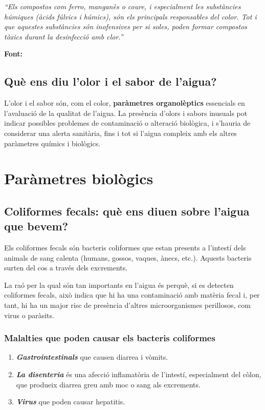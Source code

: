 \textit{“Els compostos com ferro, manganès o coure, i especialment les substàncies húmiques (àcids fúlvics i húmics), són els principals responsables del color. Tot i que aquestes substàncies són inofensives per si soles, poden formar compostos tòxics durant la desinfecció amb clor.”}~\cite{HA}

\textbf{Font:} \cite{HA}

\subsection{Què ens diu l’olor i el sabor de l’aigua?} \label{subsec:olorisabor}
L’olor i el sabor són, com el color, \textbf{paràmetres organolèptics} essencials en l’avaluació de la qualitat de l’aigua. La presència d’olors i sabors inusuals pot indicar possibles problemes de contaminació o alteració biològica, i s’hauria de considerar una alerta sanitària, fins i tot si l’aigua compleix amb els altres paràmetres químics i biològics.

\section{Paràmetres biològics} \label{sec:pb}

\subsection{Coliformes fecals: què ens diuen sobre l’aigua que bevem?} \label{subsec:coliformes}
Els coliformes fecals són bacteris coliformes que estan presents a l’intestí dels animals de sang calenta (humans, gossos, vaques, ànecs, etc.). Aquests bacteris surten del cos a través dels excrements.

La raó per la qual són tan importants en l’aigua és perquè, si es detecten coliformes fecals, això indica que hi ha una contaminació amb matèria fecal i, per tant, hi ha un major risc de presència d’altres microorganismes perillosos, com virus o paràsits.

\subsubsection{Malalties que poden causar els bacteris coliformes}
\begin{enumerate}
 \item \textit{\textbf{Gastrointestinals}} que causen diarrea i vòmits.
 \item \textit{\textbf{La disenteria}} és una afecció inflamatòria de l’intestí, especialment del còlon, que produeix diarrea greu amb moc o sang als excrements.
 \item \textit{\textbf{Virus}} que poden causar hepatitis.
\end{enumerate}

